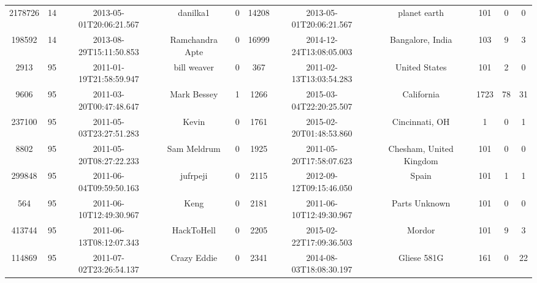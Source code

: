 \documentclass[12pt,a4paper,twoside,openright,titlepage,final]{article}
\begin{document}
\begin{landscape}
\begin{center}
\begin{longtable}{@{\extracolsep{\fill}}*{11}{c}}
	2178726            & 14           & 2013-05-01T20:06:21.567 & danilka1             & 0                  & 14208       & 2013-05-01T20:06:21.567 & planet earth            & 101                 & 0                & 0              \\
			198592             & 14           & 2013-08-29T15:11:50.853 & Ramchandra Apte      & 0                  & 16999       & 2014-12-24T13:08:05.003 & Bangalore, India        & 103                 & 9                & 3              \\
			2913               & 95           & 2011-01-19T21:58:59.947 & bill weaver          & 0                  & 367         & 2011-02-13T13:03:54.283 & United States           & 101                 & 2                & 0              \\
			9606               & 95           & 2011-03-20T00:47:48.647 & Mark Bessey          & 1                  & 1266        & 2015-03-04T22:20:25.507 & California              & 1723                & 78               & 31             \\
			237100             & 95           & 2011-05-03T23:27:51.283 & Kevin                & 0                  & 1761        & 2015-02-20T01:48:53.860 & Cincinnati, OH          & 1                   & 0                & 1              \\
			8802               & 95           & 2011-05-20T08:27:22.233 & Sam Meldrum          & 0                  & 1925        & 2011-05-20T17:58:07.623 & Chesham, United Kingdom & 101                 & 0                & 0              \\
			299848             & 95           & 2011-06-04T09:59:50.163 & jufrpeji             & 0                  & 2115        & 2012-09-12T09:15:46.050 & Spain                   & 101                 & 1                & 1              \\
			564                & 95           & 2011-06-10T12:49:30.967 & Keng                 & 0                  & 2181        & 2011-06-10T12:49:30.967 & Parts Unknown           & 101                 & 0                & 0              \\
			413744             & 95           & 2011-06-13T08:12:07.343 & HackToHell           & 0                  & 2205        & 2015-02-22T17:09:36.503 & Mordor                  & 101                 & 9                & 3              \\
			114869             & 95           & 2011-07-02T23:26:54.137 & Crazy Eddie          & 0                  & 2341        & 2014-08-03T18:08:30.197 & Gliese 581G             & 161                 & 0                & 22             \\

\end{longtable}
\end{center}
\end{landscape}
\end{document}

